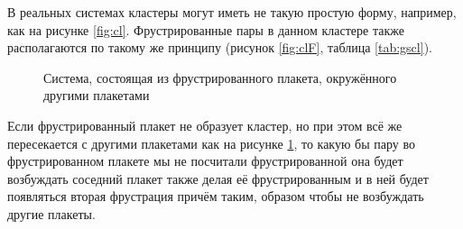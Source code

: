 \documentclass[utf8, babel, sor, jor, amsmath, amssymb, reprint]{elsarticle} %
\begin{document}
В реальных системах кластеры могут иметь не такую простую форму, например, как на рисунке \ref{fig:cl}. Фрустрированные пары в данном кластере также располагаются по такому же принципу (рисунок \ref{fig:clF}, таблица \ref{tab:gscl}).


\begin{figure}[H]
	\centering
	\caption{Система, состоящая из фрустрированного плакета, окружённого другими плакетами}
	\label{fig:4x4}
\end{figure}

Если фрустрированный плакет не образует кластер, но при этом всё же пересекается с другими плакетами как на рисунке \ref{fig:4x4}, то какую бы пару во фрустрированном плакете мы не посчитали фрустрированной она будет возбуждать соседний плакет также делая её фрустрированным и в ней будет появляться вторая фрустрация причём таким, образом чтобы не возбуждать другие плакеты. 
\end{document}

